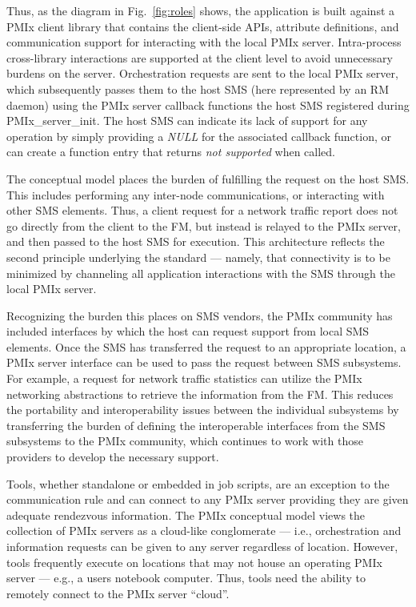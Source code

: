Thus, as the diagram in Fig.~\ref{fig:roles} shows, the application is built against a \ac{PMIx} client library that contains the client-side \acp{API},
attribute definitions, and communication support for interacting with the local \ac{PMIx} server. Intra-process cross-library interactions
are supported at the client level to avoid unnecessary burdens on the server. Orchestration requests are sent to the
local \ac{PMIx} server, which subsequently passes them to the host \ac{SMS} (here represented by an \ac{RM} daemon) using the \ac{PMIx} server callback functions the host \ac{SMS} registered during PMIx\_server\_init. The host \ac{SMS} can indicate its lack of support for any operation by simply providing a \textit{NULL} for the associated callback function, or can create a function entry that returns \textit{not supported} when called.

The conceptual model places the burden of fulfilling the request on the host \ac{SMS}. This includes performing any
inter-node communications, or interacting with other \ac{SMS} elements. Thus, a client request for a network traffic report
does not go directly from the client to the \ac{FM}, but instead is relayed to the \ac{PMIx} server, and then passed to the host \ac{SMS}
for execution. This architecture reflects the second principle underlying the standard --- namely, that connectivity is to be minimized by channeling all application interactions with the \ac{SMS} through the local \ac{PMIx} server.

Recognizing the burden this places on SMS vendors, the PMIx community has included interfaces by
which the host can request support from local SMS elements. Once the SMS has transferred the request to
an appropriate location, a PMIx server interface can be used to pass the request between SMS subsystems.
For example, a request for network traffic statistics can utilize the
PMIx networking abstractions to retrieve the information from the FM. This reduces the portability and
interoperability issues between the individual subsystems by transferring the burden of defining the
interoperable interfaces from the SMS subsystems to the PMIx community, which continues
to work with those providers to develop the necessary support.

Tools, whether standalone or embedded in job scripts, are an exception to the communication rule and can connect to
any PMIx server providing they are given adequate rendezvous information. The PMIx conceptual model views the
collection of PMIx servers as a cloud-like conglomerate --- i.e., orchestration and information requests can be
given to any server regardless of location. However, tools frequently execute on locations that may not house an
operating PMIx server --- e.g., a users notebook computer. Thus, tools need the ability to remotely connect to
the PMIx server ``cloud''.

